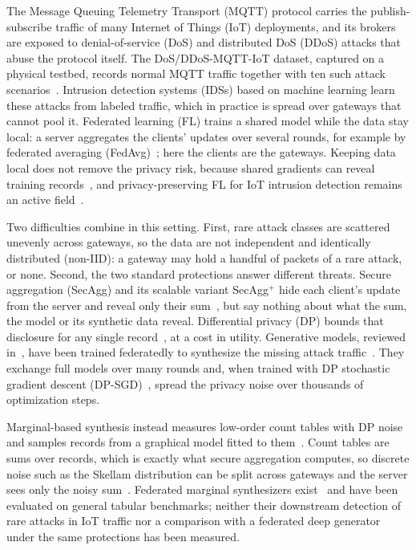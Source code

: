 \documentclass[conference]{IEEEtran}
\begin{document}
The Message Queuing Telemetry Transport (MQTT) protocol carries the publish-subscribe traffic of many Internet of Things (IoT) deployments, and its brokers are exposed to denial-of-service (DoS) and distributed DoS (DDoS) attacks that abuse the protocol itself. The DoS/DDoS-MQTT-IoT dataset, captured on a physical testbed, records normal MQTT traffic together with ten such attack scenarios~\cite{alatram2023}. Intrusion detection systems (IDSs) based on machine learning learn these attacks from labeled traffic, which in practice is spread over gateways that cannot pool it. Federated learning (FL) trains a shared model while the data stay local: a server aggregates the clients' updates over several rounds, for example by federated averaging (FedAvg)~\cite{mcmahan2017}; here the clients are the gateways. Keeping data local does not remove the privacy risk, because shared gradients can reveal training records~\cite{zhu2019}, and privacy-preserving FL for IoT intrusion detection remains an active field~\cite{vyas2024}.

Two difficulties combine in this setting. First, rare attack classes are scattered unevenly across gateways, so the data are not independent and identically distributed (non-IID): a gateway may hold a handful of packets of a rare attack, or none. Second, the two standard protections answer different threats. Secure aggregation (SecAgg) and its scalable variant SecAgg$^+$ hide each client's update from the server and reveal only their sum~\cite{bonawitz2017, bell2020}, but say nothing about what the sum, the model or its synthetic data reveal. Differential privacy (DP) bounds that disclosure for any single record~\cite{dwork2014}, at a cost in utility. Generative models, reviewed in~\cite{deng2025}, have been trained federatedly to synthesize the missing attack traffic~\cite{hamouda2024, yao2024, shettar2026}. They exchange full models over many rounds and, when trained with DP stochastic gradient descent (DP-SGD)~\cite{abadi2016dpsgd}, spread the privacy noise over thousands of optimization steps.

Marginal-based synthesis instead measures low-order count tables with DP noise and samples records from a graphical model fitted to them~\cite{zhang2017privbayes, mckenna2021mst, mckenna2024aim}. Count tables are sums over records, which is exactly what secure aggregation computes, so discrete noise such as the Skellam distribution can be split across gateways and the server sees only the noisy sum~\cite{kairouz2021, agarwal2021}. Federated marginal synthesizers exist~\cite{maddock2024, pentyala2024} and have been evaluated on general tabular benchmarks; neither their downstream detection of rare attacks in IoT traffic nor a comparison with a federated deep generator under the same protections has been measured.
\end{document}
